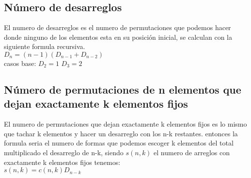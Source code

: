 \subsection{Número de desarreglos}
El numero de desarreglos es el numero de permutaciones que podemos hacer donde ninguno de los elementos esta en su posición inicial, se calculan con la siguiente formula recursiva.\\
$D_{n}=(n-1)(D_{n-1}+D_{n-2})$\\
casos base:
$D_{2}=1$ $D_{3}=2$
\subsection{Número de permutaciones de n elementos que dejan exactamente k elementos fijos}
El numero de permutaciones que dejan exactamente k elementos fijos es lo mismo que tachar k elementos y hacer un desarreglo con los n-k restantes. entonces la formula seria el numero de formas que podemos escoger k elementos del total multiplicado el desarreglo de n-k, siendo $s(n,k)$ el numero de arreglos con exactamente k elementos fijos tenemos:\\
$s(n,k)=c(n,k)D_{n-k}$
